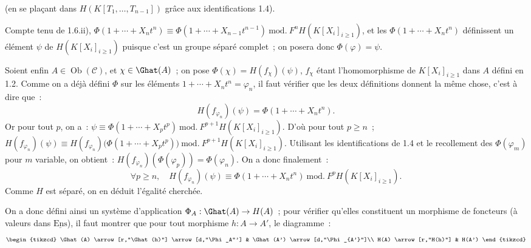 (en se plaçant
dans \(H(K[T_1,\ldots,T_{n-1}])\) grâce aux identifications 1.4).

Compte tenu de 1.6.ii), \(\Phi(1+\cdots+X_nt^n)\equiv\Phi(1+\cdots+X_{n-1}t^{n-1})\ \mathrm{mod.}\ F^nH(K[X_i]_{i\geq1})\), et les \(\Phi(1+\cdots+X_nt^n)\) définissent un élément \(\psi\) de \(H(K[X_i]_{i\geq1})\) puisque c'est un groupe séparé complet~; on posera donc \(\Phi(\varphi)=\psi\).

Soient enfin \(A\in\operatorname{Ob}(\mathcal C)\), et \(\chi\in\Ghat(A)\)~; on pose \(\Phi(\chi)=H(f_\chi)(\psi)\), \(f_\chi\) étant l'homomorphisme de \(K[X_i]_{i\geq 1}\) dans \(A\) défini en 1.2. Comme on a déjà défini \(\Phi\) sur les éléments \(1+\cdots+X_nt^n=\varphi_n\), il faut vérifier que les deux définitions donnent la même chose, c'est à dire que~:
\[
  H(f_{\varphi_n})(\psi)=\Phi(1+\cdots+X_nt^n).
\]
Or pour tout \(p\), on a~: \(\psi\equiv \Phi(1+\cdots+X_pt^p)\ \mathrm{mod.}\ F^{p+1}H(K[X_i]_{i\geq 1})\). D'où pour tout \(p\geq n\)~; \(H(f_{\varphi_n})(\psi)\equiv H(f_{\varphi_n})\bigl(\Phi(1+\cdots+X_pt^p)\bigr)\ \mathrm{mod.}\ F^{p+1}H(K[X_i]_{i\geq 1})\). Utilisant les identifications de 1.4 et le recollement des \(\Phi(\varphi_m)\) pour \(m\) variable, on obtient~: \(H(f_{\varphi_n})(\Phi(\varphi_p))=\Phi(\varphi_n)\).
On a donc finalement~:
\[
  \forall p\geq n,\quad
  H(f_{\varphi_n})(\psi)\equiv \Phi(1+\cdots+X_nt^n)
  \ \mathrm{mod.}\ F^pH(K[X_i]_{i\geq 1}).
\]
Comme \(H\) est séparé, on en déduit l'égalité cherchée.

On a donc défini ainsi un système d'application \(\Phi_A:\Ghat(A)\to H(A)\)~; pour vérifier qu'elles constituent un morphisme de foncteurs (à valeurs dans \(\underline{\mathrm{Ens}}\)), il faut montrer que pour tout morphisme \(h:A\to A'\), le diagramme~:
\[
\begin{tikzcd}
\Ghat(A) \arrow[r,"\Ghat(h)"] \arrow[d,"\Phi_A"'] &
\Ghat(A') \arrow[d,"\Phi_{A'}"]\\
H(A) \arrow[r,"H(h)"] & H(A')
\end{tikzcd}
\]
